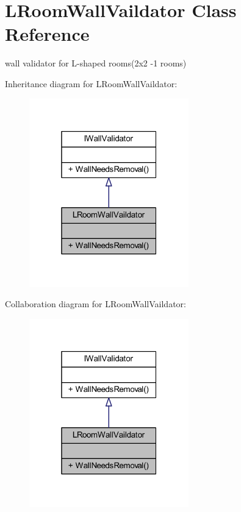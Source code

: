 \hypertarget{class_l_room_wall_vaildator}{}\section{L\+Room\+Wall\+Vaildator Class Reference}
\label{class_l_room_wall_vaildator}


wall validator for L-\/shaped rooms(2x2 -\/1 rooms)  




Inheritance diagram for L\+Room\+Wall\+Vaildator\+:\nopagebreak
\begin{figure}[H]
\begin{center}
\leavevmode
\includegraphics[width=196pt]{class_l_room_wall_vaildator__inherit__graph}
\end{center}
\end{figure}


Collaboration diagram for L\+Room\+Wall\+Vaildator\+:\nopagebreak
\begin{figure}[H]
\begin{center}
\leavevmode
\includegraphics[width=196pt]{class_l_room_wall_vaildator__coll__graph}
\end{center}
\end{figure}
